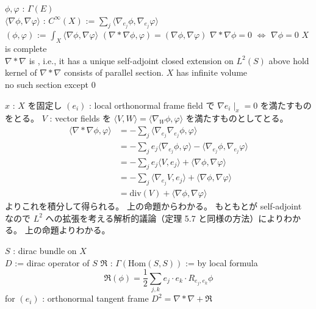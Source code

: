 \begin{Theorem}
\itemdefi
  \For \(\phi , \varphi\) : \(\Gamma(E)\) \\
  \Define \(\langle \nabla \phi , \nabla \varphi \rangle\) : \(C^{\infty}(X)\) := \(\sum_j \langle \nabla_{e_j} \phi , \nabla_{e_j} \varphi \rangle\) \\
  \Define \((\phi , \varphi)\) := \(\int_X \langle \nabla \phi , \nabla \varphi \rangle\)
\itemprop
  \((\nabla * \nabla \phi , \varphi) = (\nabla \phi , \nabla \varphi)\)
\itemprop
  \(\nabla * \nabla \phi = 0\) \(\iff\) \(\nabla \phi = 0\)
\itemprop
  \IfHold \(X\) is complete \\
  \Then \(\nabla * \nabla\) is , i.e., it has a unique self-adjoint closed extension on \(L^2(S)\)
\itemprop
  \IfHold above hold \\
  \Then kernel of \(\nabla * \nabla\) consists of parallel section.
\itemprop
  \IfHold \(X\) has infinite volume \\
  \Then no such section except \(0\)
\end{Theorem}

\begin{Proof}
\itemprof
  \(x\) : \(X\) を固定し \((e_i)\) : local orthonormal frame field で \(\nabla e_i \mid_x = 0\) を満たすものをとる。
  \(V\) : vector fields を \(\langle V , W \rangle = \langle \nabla_W \phi , \varphi \rangle\) を満たすものとしてとる。
  \begin{align*}
    \langle \nabla * \nabla \phi , \varphi \rangle
    &= - \sum_j \langle \nabla_{e_j} \nabla_{e_j} \phi , \varphi \rangle \\
    &= - \sum_j e_j \langle \nabla_{e_j} \phi , \varphi \rangle - \langle \nabla_{e_j} \phi , \nabla_{e_j} \varphi \rangle \\
    &= - \sum_j e_j \langle V , e_j \rangle + \langle \nabla \phi , \nabla \varphi \rangle \\
    &= - \sum_j \langle \nabla_{e_j} V , e_j \rangle + \langle \nabla \phi , \nabla \varphi \rangle \\
    &= \text{div}(V) + \langle \nabla \phi , \nabla \varphi \rangle
  \end{align*}
  よりこれを積分して得られる。
\itemprof
  上の命題からわかる。
\itemprof
  もともとが self-adjoint なので \(L^2\) への拡張を考える解析的議論（定理 5.7 と同様の方法）によりわかる。
\itemprof
  上の命題よりわかる。
\itemprof
  \SORRY
\end{Proof}

\begin{Theorem}
\itemwhen
  \Fix \(S\) : dirac bundle on \(X\) \\
  \Fix \(D\) := dirac operator of \(S\)
\itemdefi
  \Define \(\mathfrak{R}\) : \(\Gamma(\text{Hom}(S,S))\) := by local formula
  \[\mathfrak{R}(\phi) = \frac{1}{2} \sum_{j,k} e_j \cdot e_k \cdot R_{e_j , e_k} \phi\] for \((e_i)\) : orthonormal tangent frame
\itemprop
  \(D^2 = \nabla * \nabla + \mathfrak{R}\)
\end{Theorem}

